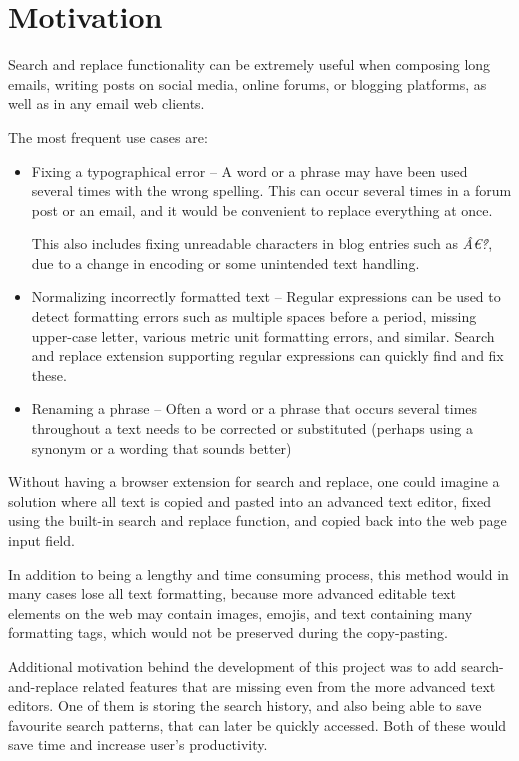 \documentclass[bsc,frontabs,twoside,singlespacing,parskip,deptreport]{infthesis}
\begin{document}
\section{Motivation}
Search and replace functionality can be extremely useful when composing long emails, writing posts on social media, online forums, or blogging platforms, as well as in any email web clients. 

The most frequent use cases are:
\begin{itemize}
\item Fixing a typographical error -- A word or a phrase may have been used several times with the wrong spelling. This can occur several times in a forum post or an email, and it would be convenient to replace everything at once.

This also includes fixing unreadable characters in blog entries such as {\it \^{A}\euro\r{?}}, due to a change in encoding or some unintended text handling.

\item Normalizing incorrectly formatted text -- Regular expressions can be used to detect formatting errors such as multiple spaces before a period, missing upper-case letter, various metric unit formatting errors, and similar. Search and replace extension supporting regular expressions can quickly find and fix these.

\item Renaming a phrase -- Often a word or a phrase that occurs several times throughout a text needs to be corrected or substituted (perhaps using a synonym or a wording that sounds better)
\end{itemize}

Without having a browser extension for search and replace, one could imagine a solution where all text is copied and pasted into an advanced text editor, fixed using the built-in search and replace function, and copied back into the web page input field.

In addition to being a lengthy and time consuming process, this method would in many cases lose all text formatting, because more advanced editable text elements on the web may contain images, emojis, and text containing many formatting tags, which would not be preserved during the copy-pasting.

Additional motivation behind the development of this project was to add search-and-replace related features that are missing even from the more advanced text editors. One of them is storing the search history, and also being able to save favourite search patterns, that can later be quickly accessed. Both of these would save time and increase user's productivity.
\end{document}
